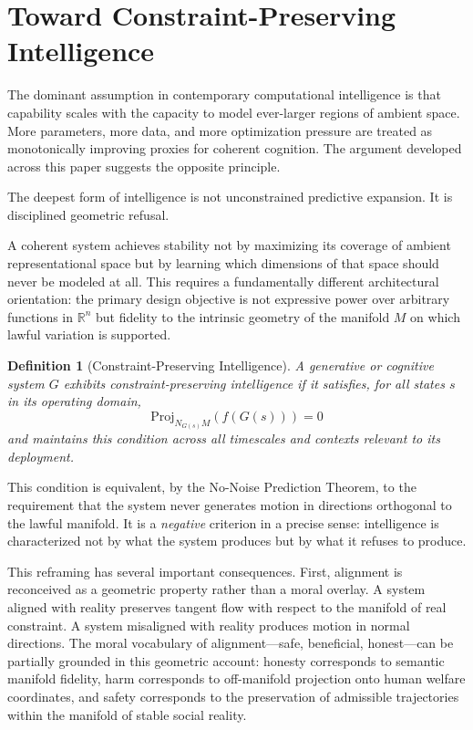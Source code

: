 \documentclass[11pt,a4paper,twocolumn]{article}
\newtheorem{definition}[theorem]{Definition}
\begin{document}

\section{Toward Constraint-Preserving Intelligence}

The dominant assumption in contemporary computational
intelligence is that capability scales with the capacity
to model ever-larger regions of ambient space. More
parameters, more data, and more optimization pressure are
treated as monotonically improving proxies for coherent
cognition. The argument developed across this paper
suggests the opposite principle.

The deepest form of intelligence is not unconstrained
predictive expansion. It is disciplined geometric refusal.

A coherent system achieves stability not by maximizing
its coverage of ambient representational space but by
learning which dimensions of that space should never be
modeled at all. This requires a fundamentally different
architectural orientation: the primary design objective
is not expressive power over arbitrary functions in
$\mathbb{R}^n$ but fidelity to the intrinsic geometry
of the manifold $M$ on which lawful variation is
supported.

\begin{definition}[Constraint-Preserving Intelligence]
A generative or cognitive system $G$ exhibits
constraint-preserving intelligence if it satisfies,
for all states $s$ in its operating domain,
\[
\mathrm{Proj}_{N_{G(s)} M}(f(G(s))) = 0
\]
and maintains this condition across all timescales and
contexts relevant to its deployment.
\end{definition}

This condition is equivalent, by the No-Noise Prediction
Theorem, to the requirement that the system never generates
motion in directions orthogonal to the lawful manifold.
It is a \emph{negative} criterion in a precise sense:
intelligence is characterized not by what the system
produces but by what it refuses to produce.

This reframing has several important consequences. First,
alignment is reconceived as a geometric property rather
than a moral overlay. A system aligned with reality
preserves tangent flow with respect to the manifold of
real constraint. A system misaligned with reality produces
motion in normal directions. The moral vocabulary of
alignment---safe, beneficial, honest---can be partially
grounded in this geometric account: honesty corresponds
to semantic manifold fidelity, harm corresponds to
off-manifold projection onto human welfare coordinates,
and safety corresponds to the preservation of admissible
trajectories within the manifold of stable social reality.
\end{document}
